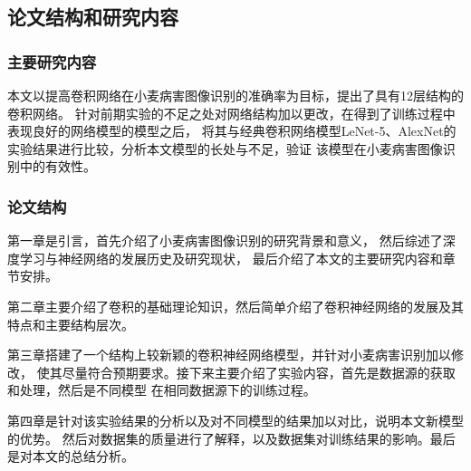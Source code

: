 \subsection{\hei\xiaosan\textbf{论文结构和研究内容}}
  \subsubsection{\hei\sihao\textbf{主要研究内容}}
    本文以提高卷积网络在小麦病害图像识别的准确率为目标，提出了具有12层结构的卷积网络。
    针对前期实验的不足之处对网络结构加以更改，在得到了训练过程中表现良好的网络模型的模型之后，
    将其与经典卷积网络模型LeNet-5、AlexNet的实验结果进行比较，分析本文模型的长处与不足，验证
    该模型在小麦病害图像识别中的有效性。
    

  \subsubsection{\hei\sihao\textbf{论文结构}}
    第一章是引言，首先介绍了小麦病害图像识别的研究背景和意义，
    然后综述了深度学习与\zs 神经网络的\zs 发展历史及\zs 研究现状，
    最后介绍\zs 了本文的主要研究内容和章节安排。

    第二章主要介绍了卷积的基础理论知识，然后简单介绍了卷积神经网络的发展及其特点和主要结构层次。

    第三章搭建了一个结构上较新颖的卷积神经网络模型，并针对小麦病害识别加以修改，
    使其尽量符合预期要求。接下来主要介绍了实验内容，首先是数据源的获取和处理，然后是不同模型
    在相同数据源下的训练过程。

    第四章是针对该实验结果的分析以及对不同模型的结果加以对比，说明本文新模型的优势。
    然后对数据集的质量进行了解释，以及数据集对训练结果的影响。最后是对本文的总结分析。